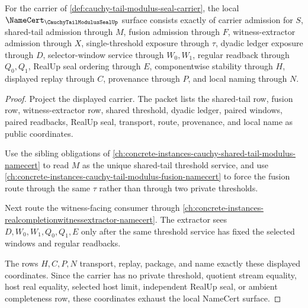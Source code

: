 \begin{theorem}
\label{thm:cauchy-tail-modulus-seal-namecert-obligations}
For the carrier of \autoref{def:cauchy-tail-modulus-seal-carrier}, the local $\NameCert_{\CauchyTailModulusSealUp}$ surface consists exactly of carrier admission for $S$, shared-tail admission through $M$, fusion admission through $F$, witness-extractor admission through $X$, single-threshold exposure through $\tau$, dyadic ledger exposure through $D$, selector-window service through $W_0,W_1$, regular readback through $Q_0,Q_1$, RealUp seal ordering through $E$, componentwise stability through $H$, displayed replay through $C$, provenance through $P$, and local naming through $N$.
\end{theorem}
\begin{proof}
Project the displayed carrier. The packet lists the shared-tail row, fusion row, witness-extractor row, shared threshold, dyadic ledger, paired windows, paired readbacks, RealUp seal, transport, route, provenance, and local name as public coordinates.

Use the sibling obligations of \autoref{ch:concrete-instances-cauchy-shared-tail-modulus-namecert} to read $M$ as the unique shared-tail threshold service, and use \autoref{ch:concrete-instances-cauchy-tail-modulus-fusion-namecert} to force the fusion route through the same $\tau$ rather than through two private thresholds.

Next route the witness-facing consumer through \autoref{ch:concrete-instances-realcompletionwitnessextractor-namecert}. The extractor sees $D,W_0,W_1,Q_0,Q_1,E$ only after the same threshold service has fixed the selected windows and regular readbacks.

The rows $H,C,P,N$ transport, replay, package, and name exactly these displayed coordinates. Since the carrier has no private threshold, quotient stream equality, host real equality, selected host limit, independent RealUp seal, or ambient completeness row, these coordinates exhaust the local NameCert surface.
\end{proof}

